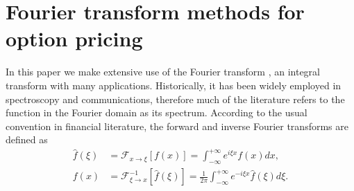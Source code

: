 \documentclass[11pt,a4paper]{article}
\begin{document}
\section{Fourier transform methods for option pricing}\label{sec:fourhilb}

In this paper we make extensive use of the Fourier transform \citep[see e.g.][]{Kreyszig2011,Polyanin1998}, an integral transform with many applications. Historically, it has been widely employed in spectroscopy and communications, therefore much of the literature refers to the function in the Fourier domain as its spectrum. According to the usual convention in financial literature, the forward and inverse Fourier transforms are defined as
\begin{align}
\widehat{f}(\xi)&=\mathcal{F}_{x\rightarrow\xi} \left[f(x)\right]=\int^{+\infty}_{-\infty}e^{i\xi x}f(x)dx, \label{eq:FwdFourier}\\
f(x)&=\mathcal{F}^{-1}_{\xi\rightarrow x} \left[\widehat{f}(\xi)\right]=\frac{1}{2\pi}\int^{+\infty}_{-\infty}e^{-i\xi x}\widehat{f}(\xi)d\xi \label{eq:RevFourier}.
\end{align}
\end{document}
